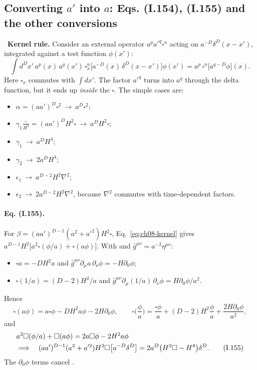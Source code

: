 \subsection{Converting $a'$ into $a$: Eqs. (I.154), (I.155) and the other conversions}
\tD\ \textbf{Kernel rule.} Consider an external operator $a^pa'^q\square^n$ acting on $a^{-D}\delta^D(x-x')$, integrated against a test function $\phi(x')$:
\begin{equation}
\int d^Dx'\,a^p(x)\,a^q(x')\,\square_x^n\big[a^{-D}(x)\,\delta^D(x-x')\big]\phi(x')=a^p\,\square^n\big[a^{q-D}\phi\big](x).
\label{eq:ch08-kernel}
\end{equation}
Here $\square_x$ commutes with $\int dx'$. The factor $a'^q$ turns into $a^q$ through the delta function, but it ends up \emph{inside} the $\square$. The simple cases are:
\begin{itemize}[itemsep=0pt]
\item $\alpha=(aa')^D\square^2\ \to\ a^D\square^2$;
\item $\gamma_1\frac{\square}{H^2}=(aa')^DH^2\square\ \to\ a^DH^2\square$;
\item $\gamma_1\ \to\ a^DH^4$;
\item $\gamma_2\ \to\ 2a^DH^4$;
\item $\epsilon_1\ \to\ a^{D-2}H^2\nabla^2$;
\item $\epsilon_2\ \to\ 2a^{D-2}H^2\nabla^2$, because $\nabla^2$ commutes with time-dependent factors.
\end{itemize}

\paragraph{Eq. (I.155).} For $\beta=(aa')^{D-1}(a^2+a'^2)H^2\square$, Eq.~\eqref{eq:ch08-kernel} gives $a^{D-1}H^2\big[a^2\square(\phi/a)+\square(a\phi)\big]$.
With  and $\hat g^{\mu\nu}=a^{-2}\eta^{\mu\nu}$:
\begin{itemize}[itemsep=0pt]
\item $\square a=-DH^2a$ and $\hat g^{\mu\nu}\partial_\mu a\,\partial_\nu\phi=-H\partial_0\phi$;
\item $\square(1/a)=(D-2)H^2/a$ and $\hat g^{\mu\nu}\partial_\mu(1/a)\,\partial_\nu\phi=H\partial_0\phi/a^2$.
\end{itemize}
Hence
\begin{equation*}
\square(a\phi)=a\square\phi-DH^2a\phi-2H\partial_0\phi,\qquad
\square\Big(\frac\phi a\Big)=\frac{\square\phi}{a}+(D-2)H^2\frac\phi a+\frac{2H\partial_0\phi}{a^2},
\end{equation*}
and
\begin{align}
&a^2\square(\phi/a)+\square(a\phi)=2a\square\phi-2H^2a\phi \notag\\
&\Longrightarrow\quad
(aa')^{D-1}(a^2+a'^2)H^2\square\big[a^{-D}\delta^D\big]=2a^D\big(H^2\square-H^4\big)\delta^D .
\tag{I.155}
\end{align}
The $\partial_0\phi$ terms cancel \chEok.

